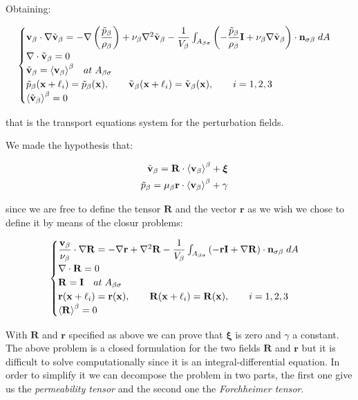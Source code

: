 Obtaining:

\begin{eqnarray}
	\begin{cases}
		\textbf{v}_{\beta} \cdot \nabla \tilde{\textbf{v}}_{\beta} = -\nabla \left(\dfrac{\tilde{p}_{\beta}}{\rho_{\beta}}\right) + \nu_{\beta} \nabla^2 \tilde{\textbf{v}}_{\beta} - \dfrac{1}{V_\beta} \int_{A_{\beta \sigma}} \left(-\dfrac{\tilde{p}_{\beta}}{\rho_{\beta}} \mathbf{I}  + \nu_{\beta} \nabla \tilde{\textbf{v}}_{\beta} \right) \cdot \mathbf{n}_{\sigma \beta} \;dA  \\
		\nabla \cdot \tilde{\textbf{v}}_{\beta} = 0  \\
		\tilde{\textbf{v}}_{\beta} = {\left< \textbf{v}_{\beta} \right>}^{\beta} \quad at \; A_{\beta \sigma} \\
		\tilde{p}_{\beta}(\mathbf{x} +\ell_i) = \tilde{p}_{\beta}(\mathbf{x}), \qquad \tilde{\textbf{v}}_{\beta}(\mathbf{x} +\ell_i) = \tilde{\textbf{v}}_{\beta}(\mathbf{x}), \qquad i=1,2,3 \\
		{\left< \tilde{\textbf{v}}_{\beta} \right>}^{\beta} = 0
	\end{cases}
\label{eq:vans_mom_}
\end{eqnarray}

that is the transport equations system for the perturbation fields.

We made the hypothesis that:

\begin{eqnarray}
&& \tilde{\textbf{v}}_{\beta} = \mathbf{R} \cdot {\left< \textbf{v}_{\beta}\right>}^{\beta} +\boldsymbol{\xi}  \\
&& \tilde{p}_{\beta} = \mu_{\beta} \mathbf{r} \cdot {\left< \textbf{v}_{\beta}\right>}^{\beta} + \gamma
\end{eqnarray}

since we are free to define the tensor $\mathbf{R}$  and the vector $\mathbf{r}$ as we wish we chose to define it by means of the closur problems:

\begin{eqnarray}
	\begin{cases}
		\dfrac{\textbf{v}_{\beta}}{\nu_{\beta}} \cdot  \nabla \mathbf{R} = -\nabla \mathbf{r} + \nabla^2 \mathbf{R} - \dfrac{1}{V_\beta} \int_{A_{\beta \sigma}} \left(-\mathbf{r}\mathbf{I}  +  \nabla \mathbf{R} \right) \cdot \mathbf{n}_{\sigma \beta} \;dA  \\
		\nabla \cdot \mathbf{R} = 0  \\
		\mathbf{R} = \mathbf{I} \quad at \; A_{\beta \sigma} \\
		\mathbf{r}(\mathbf{x} +\ell_i) = \mathbf{r}(\mathbf{x}), \qquad \mathbf{R}(\mathbf{x} +\ell_i) = \mathbf{R}(\mathbf{x}), \qquad i=1,2,3 \\
		{\left< \mathbf{R} \right>}^{\beta} = 0
	\end{cases}
\label{eq:R_problem}
\end{eqnarray}

With  $\mathbf{R}$ and $\mathbf{r}$ specified as above we can prove that $\boldsymbol{\xi}$ is zero and $\gamma$ a constant.
The above problem is a closed formulation for the two fields  $\mathbf{R}$ and $\mathbf{r}$ but it is difficult to solve computationally since it is an integral-differential equation.
In order to simplify it we can decompose the problem in two parts, the first one give us the \textit{permeability tensor} and the second one the \textit{Forchheimer tensor}.

